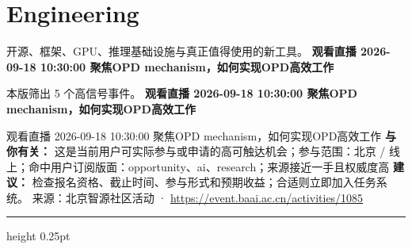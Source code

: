 \documentclass[10.5pt]{ctexart}
\begin{document}
\section*{Engineering}
{\color{ormuted} 开源、框架、GPU、推理基础设施与真正值得使用的新工具。}
\vspace{2mm}
{\LARGE\bfseries 观看直播 2026-09-18 10:30:00 聚焦OPD mechanism，如何实现OPD高效工作}\par
\vspace{1mm}
{\color{ormuted} 本版筛出 5 个高信号事件。}
\vspace{3mm}
{\Large\bfseries 观看直播 2026-09-18 10:30:00 聚焦OPD mechanism，如何实现OPD高效工作}\par
观看直播 2026-09-18 10:30:00 聚焦OPD mechanism，如何实现OPD高效工作
\textbf{与你有关：} 这是当前用户可实际参与或申请的高可触达机会；参与范围：北京 / 线上；命中用户订阅版面：opportunity、ai、research；来源接近一手且权威度高
\textbf{建议：} 检查报名资格、截止时间、参与形式和预期收益；合适则立即加入任务系统。
{\footnotesize\color{ormuted} 来源：北京智源社区活动 · \url{https://event.baai.ac.cn/activities/1085}}
\vspace{4mm}
\hrule height 0.25pt
\vspace{3mm}
\end{document}
